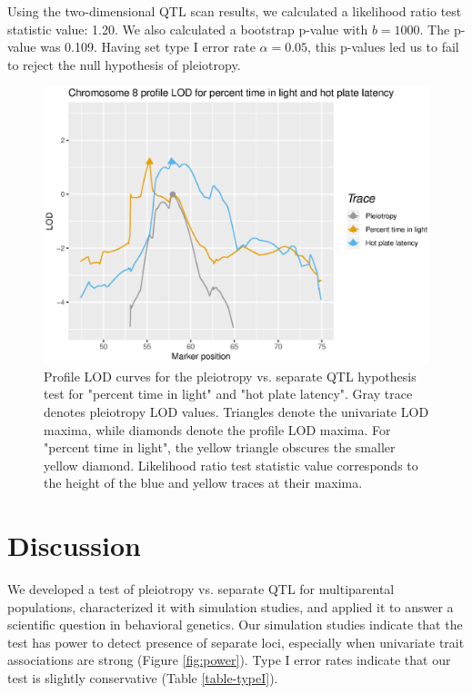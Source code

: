 \documentclass[12pt,twoside, lineno]{gsajnl}
\begin{document}
Using the two-dimensional QTL scan results, we calculated a likelihood ratio test statistic value: 1.20. We also calculated a bootstrap p-value with $b = 1000$. The p-value was 0.109. Having set type I error rate $\alpha = 0.05$, this p-values led us to fail to reject the null hypothesis of pleiotropy.


\begin{figure}
\includegraphics[width = \textwidth]{../Rmd/profile.eps}
\caption{Profile LOD curves for the pleiotropy vs. separate QTL hypothesis test for "percent time in light" and "hot plate latency". Gray trace denotes pleiotropy LOD values. Triangles denote the univariate LOD maxima, while diamonds denote the profile LOD maxima. For "percent time in light", the yellow triangle obscures the smaller yellow diamond. Likelihood ratio test statistic value corresponds to the height of the blue and yellow traces at their maxima.}
\label{fig:profiles}
\end{figure}








\section{Discussion}

We developed a test of pleiotropy vs. separate QTL for multiparental populations, characterized it with simulation studies, and applied it to answer a scientific question in behavioral genetics. Our simulation studies indicate that the test has power to detect presence of separate loci, especially when univariate trait associations are strong (Figure \ref{fig:power}). Type I error rates indicate that our test is slightly conservative (Table \ref{table-typeI}).
\end{document}
